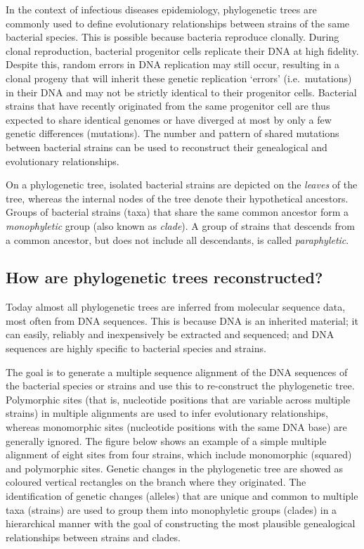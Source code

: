 \documentclass[11pt]{article}
\begin{document}
In the context of infectious diseases epidemiology, phylogenetic trees
are commonly used to define evolutionary relationships between strains
of the same bacterial species. This is possible because bacteria
reproduce clonally. During clonal reproduction, bacterial progenitor
cells replicate their DNA at high fidelity. Despite this, random errors
in DNA replication may still occur, resulting in a clonal progeny that
will inherit these genetic replication `errors' (i.e.~mutations) in
their DNA and may not be strictly identical to their progenitor cells.
Bacterial strains that have recently originated from the same progenitor
cell are thus expected to share identical genomes or have diverged at
most by only a few genetic differences (mutations). The number and
pattern of shared mutations between bacterial strains can be used to
reconstruct their genealogical and evolutionary relationships.

On a phylogenetic tree, isolated bacterial strains are depicted on the
\textit{leaves} of the tree, whereas the internal nodes of the tree denote
their hypothetical ancestors. Groups of bacterial strains (taxa) that
share the same common ancestor form a \textit{monophyletic} group (also
known as \textit{clade}). A group of strains that descends from a common
ancestor, but does not include all descendants, is called
\textit{paraphyletic}.

    \hypertarget{how-are-phylogenetic-trees-reconstructed}{%
\subsection{How are phylogenetic trees
reconstructed?}\label{how-are-phylogenetic-trees-reconstructed}}

Today almost all phylogenetic trees are inferred from molecular sequence
data, most often from DNA sequences. This is because DNA is an inherited
material; it can easily, reliably and inexpensively be extracted and
sequenced; and DNA sequences are highly specific to bacterial species
and strains.

The goal is to generate a multiple sequence alignment of the DNA
sequences of the bacterial species or strains and use this to
re-construct the phylogenetic tree. Polymorphic sites (that is,
nucleotide positions that are variable across multiple strains) in
multiple alignments are used to infer evolutionary relationships,
whereas monomorphic sites (nucleotide positions with the same DNA base)
are generally ignored. The figure below shows an example of a simple
multiple alignment of eight sites from four strains, which include
monomorphic (squared) and polymorphic sites. Genetic changes in the
phylogenetic tree are showed as coloured vertical rectangles on the
branch where they originated. The identification of genetic changes
(alleles) that are unique and common to multiple taxa (strains) are used
to group them into monophyletic groups (clades) in a hierarchical manner
with the goal of constructing the most plausible genealogical
relationships between strains and clades.
\end{document}

